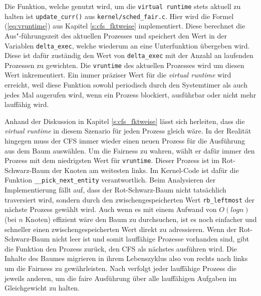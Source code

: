 Die Funktion, welche genutzt wird, um die  \texttt{virtual \- runtime} stets aktuell zu halten ist \texttt{update\_curr()} aus \texttt{kernel/sched\_fair.c}. Hier wird die Formel (\ref{eq:vruntime}) aus Kapitel \ref{s:cfs_fktweise} implementiert. Diese berechnet die Aus"-führungszeit des aktuellen Prozesses und speichert den Wert in der Variablen \texttt{delta\_exec}, welche wiederum an eine Unterfunktion über\-geben wird. Diese ist dafür zuständig den Wert von \texttt{delta\-\_exec} mit der Anzahl an laufenden Prozessen zu gewichten. Die \texttt{vruntime} des aktuellen Prozesses wird um diesen Wert inkrementiert.  Ein immer präziser Wert für die \textit{virtual runtime} wird erreicht, weil diese Funktion sowohl periodisch durch den Systemtimer als auch jedes Mal augerufen wird, wenn ein Prozess blockiert, ausführbar oder nicht mehr lauffähig wird. 

Anhand der Diskussion in Kapitel \ref{s:cfs_fktweise} lässt sich herleiten, dass die \textit{virtual runtime} in diesem Szenario für jeden Prozess gleich wäre. In der Realität hingegen muss der CFS immer wieder einen neuen Prozess für die Ausführung aus dem Baum auswählen. Um die Fairness zu wahren, wählt er dafür immer den Prozess mit dem niedrigsten Wert für \texttt{vruntime}. Dieser Prozess ist im Rot-Schwarz-Baum der Knoten am weitesten links. Im Kernel-Code ist dafür die Funktion \texttt{\_\_pick\_next\_entity} verantwortlich. Beim \- Analysieren der Implementierung fällt auf, dass der Rot-Schwarz-Baum nicht tatsächlich traversiert wird, sondern durch den zwischengespeicherten Wert \texttt{rb\_leftmost} der nächste Prozess gewählt wird. Auch wenn es mit einem Aufwand von $O(log n)$ (bei $n$ Knoten) effizient wäre den Baum zu durchsuchen, ist es noch einfacher und schneller einen zwischengespeicherten Wert direkt zu adressieren. Wenn der Rot-Schwarz-Baum nicht leer ist und somit lauffähige Prozesse vorhanden sind, gibt die Funktion den Prozess zurück, den CFS als nächstes ausführen wird. Die Inhalte des Baumes migrieren in ihrem Lebenszyklus also von rechts nach links um die Fairness zu gewährleisten. Nach \cite{mjones} verfolgt jeder lauffähige Prozess die jeweils anderen, um die faire Ausführung über alle lauffähigen Aufgaben im Gleichgewicht zu halten.

